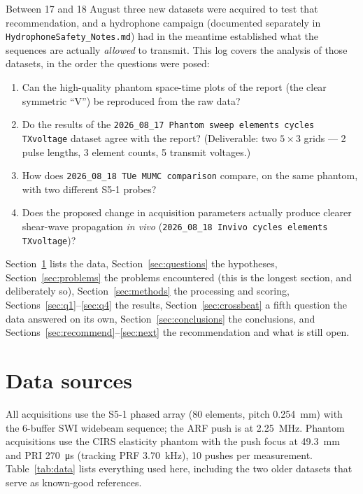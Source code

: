 \documentclass[11pt,a4paper]{article}
\begin{document}
Between 17 and 18 August three new datasets were acquired to test that recommendation, and a hydrophone
campaign (documented separately in \texttt{HydrophoneSafety\_Notes.md}) had in the meantime established
what the sequences are actually \emph{allowed} to transmit. This log covers the analysis of those
datasets, in the order the questions were posed:

\begin{enumerate}[label=\textbf{Q\arabic*.}]
  \item Can the high-quality phantom space-time plots of the report (the clear symmetric ``V'') be
        reproduced from the raw data?
  \item Do the results of the \texttt{2026\_08\_17 Phantom sweep elements cycles TXvoltage} dataset
        agree with the report? (Deliverable: two $5\times3$ grids --- 2 pulse lengths, 3 element
        counts, 5 transmit voltages.)
  \item How does \texttt{2026\_08\_18 TUe MUMC comparison} compare, on the same phantom, with two
        different S5-1 probes?
  \item Does the proposed change in acquisition parameters actually produce clearer shear-wave
        propagation \emph{in vivo}
        (\texttt{2026\_08\_18 Invivo cycles elements TXvoltage})?
\end{enumerate}

Section~\ref{sec:data} lists the data, Section~\ref{sec:questions} the hypotheses,
Section~\ref{sec:problems} the problems encountered (this is the longest section, and deliberately so),
Section~\ref{sec:methods} the processing and scoring, Sections~\ref{sec:q1}--\ref{sec:q4} the results,
Section~\ref{sec:crossbeat} a fifth question the data answered on its own, Section~\ref{sec:conclusions} the conclusions, and Sections~\ref{sec:recommend}--\ref{sec:next} the
recommendation and what is still open.

\section{Data sources}\label{sec:data}
All acquisitions use the S5-1 phased array (80 elements, pitch \SI{0.254}{\milli\metre}) with the
6-buffer SWI widebeam sequence; the ARF push is at \SI{2.25}{\mega\hertz}. Phantom acquisitions use the
CIRS elasticity phantom with the push focus at \SI{49.3}{\milli\metre} and PRI
\SI{270}{\micro\second} (tracking PRF \SI{3.70}{\kilo\hertz}), 10 pushes per measurement.
Table~\ref{tab:data} lists everything used here, including the two older datasets that serve as
known-good references.
\end{document}
